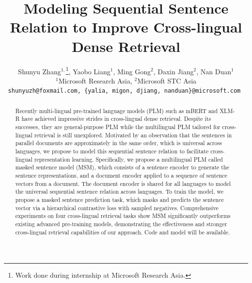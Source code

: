 \documentclass{article} %
\title{Modeling Sequential Sentence Relation to Improve Cross-lingual Dense Retrieval}
\author{ Shunyu Zhang$^{1,}$\thanks{Work done during internship at Microsoft Research Asia.}\enspace , Yaobo Liang$^{1}$, Ming Gong$^{2}$, Daxin Jiang$^{2}$, Nan Duan$^{1}$\\
 $^1$Microsoft Research Asia,  $^2$Microsoft STC Asia \\
\tt  shunyuzh@foxmail.com,
\tt  \{yalia, migon, djiang, nanduan\}@microsoft.com
}
\begin{document}
\maketitle

\begin{abstract}



Recently multi-lingual pre-trained language models (PLM) such as mBERT and XLM-R have achieved impressive strides in cross-lingual dense retrieval. Despite its successes, they are general-purpose PLM while the multilingual PLM tailored for cross-lingual retrieval is still unexplored. Motivated by an observation that the sentences in parallel documents are approximately in the same order, which is universal across languages, we propose to model this sequential sentence relation to facilitate cross-lingual representation learning. Specifically, we propose a multilingual PLM called masked sentence model (MSM), which consists of a sentence encoder to generate the sentence representations, and a document encoder applied to a sequence of sentence vectors from a document. The document encoder is shared for all languages to model the universal sequential sentence relation across languages. To train the model, we propose a masked sentence prediction task, which masks and predicts the sentence vector via a hierarchical contrastive loss with sampled negatives. Comprehensive experiments on four cross-lingual retrieval tasks show MSM significantly outperforms existing advanced pre-training models, demonstrating the effectiveness and stronger cross-lingual retrieval capabilities of our approach. Code and model will be available.





\end{abstract}
\end{document}
